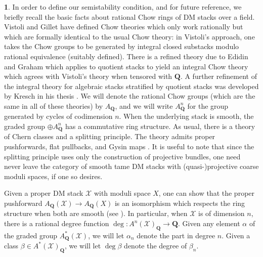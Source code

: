 \documentclass[11pt]{amsart}
\newcommand{\field}[1]{\mathbf #1}
\newcommand{\ms}[1]{\mathscr #1}
\newcommand{\Q}{\field Q}
\renewcommand{\[}{[\!\hspace{0.03em}[}
\renewcommand{\]}{]\!\hspace{0.03em}]}
\renewcommand{\(}{(\!\hspace{0.03em}(}
\renewcommand{\)}{)\!\hspace{0.03em})}
\theoremstyle{definition}
\newtheorem{para}[lem]{\indent}
\theoremstyle{remark}
\begin{document}
\begin{para} In order to define our semistability condition, and for 
future reference, we briefly recall the basic facts about rational 
Chow rings of DM stacks over a field.  Vistoli \cite{vistoli} and 
Gillet \cite{gillet} have defined Chow 
theories which only work rationally but which are formally identical 
to the usual Chow theory: in Vistoli's approach, one takes the Chow groups to be generated by 
integral closed substacks modulo rational equivalence (suitably 
defined).  There is a refined theory due to Edidin and 
Graham \cite{edidin-graham} which 
applies to quotient stacks to yield an integral Chow theory which 
agrees with Vistoli's theory when tensored with $\Q$.  A further 
refinement of the integral theory for algebraic stacks stratified by 
quotient stacks was developed by Kresch in his 
thesis \cite{kresch-cycle}.  We will denote 
the rational Chow groups (which are the same in all of these theories) by $A_{\Q}$, and we will write $A^{n}_{\Q}$ for 
the group generated by cycles of codimension $n$.  When the 
underlying stack is smooth, the graded group $\oplus A^{n}_{\Q}$ has a 
commutative ring structure.  As usual, there is a theory of Chern classes 
and a splitting principle.  The theory admits proper pushforwards, 
flat pullbacks, and Gysin maps \cite{vistoli}.  It is useful to note 
that since the splitting principle uses only the construction of 
projective bundles, one need never leave the category of smooth tame 
DM stacks with (quasi-)projective coarse moduli spaces, if one so 
desires.

Given a proper DM stack $\ms X$ with moduli space $X$, 
one can show that the proper pushforward $A_{\Q}(\ms X)\to A_{\Q}(X)$ is an 
isomorphism which respects the ring structure when both are smooth (see \cite{vistoli}).  
In particular, when $\ms X$ is of dimension $n$, there is a rational 
degree function $\deg:A^{n}(\ms X)_{\Q}\to\Q$.  Given 
any element $\alpha$ of the graded group $A^{\ast}_{\Q}(\ms X)$, we will 
let $\alpha_{n}$ denote the part in degree $n$.  Given a class 
$\beta\in A^{\ast}(\ms X)_{\Q}$, we will let $\deg\beta$ denote the 
degree of $\beta_{n}$.



\end{para}
\end{document}
